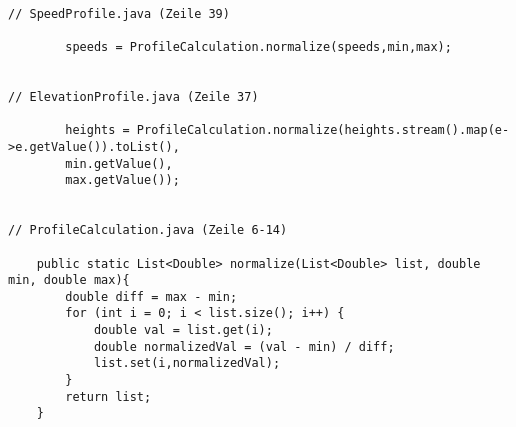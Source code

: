 \begin{lstlisting}[caption={Angewandtes DRY-Prinzip nach dem Commit}]

// SpeedProfile.java (Zeile 39)

		speeds = ProfileCalculation.normalize(speeds,min,max);
		
		
// ElevationProfile.java (Zeile 37)

		heights = ProfileCalculation.normalize(heights.stream().map(e->e.getValue()).toList(),
		min.getValue(),
		max.getValue());


// ProfileCalculation.java (Zeile 6-14)

    public static List<Double> normalize(List<Double> list, double min, double max){
        double diff = max - min;
        for (int i = 0; i < list.size(); i++) {
            double val = list.get(i);
            double normalizedVal = (val - min) / diff;
            list.set(i,normalizedVal);
        }
        return list;
    }


\end{lstlisting}